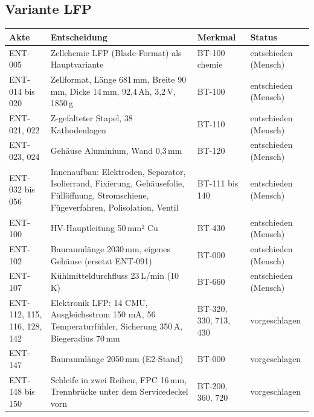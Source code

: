 \documentclass[10pt,a4paper]{article}
\begin{document}
\subsection*{Variante LFP}
\begin{longtable}{@{}p{1.9cm}p{7.2cm}p{3.5cm}p{2.0cm}@{}}\toprule
\textbf{Akte} & \textbf{Entscheidung} & \textbf{Merkmal} & \textbf{Status}\\\midrule\endhead
ENT-005 & Zellchemie LFP (Blade-Format) als Hauptvariante & BT-100 chemie & entschieden (Mensch)\\
ENT-014 bis 020 & Zellformat, Länge 681\,mm, Breite 90\,mm, Dicke 14\,mm, 92,4\,Ah, 3,2\,V, 1850\,g & BT-100 & entschieden (Mensch)\\
ENT-021, 022 & Z-gefalteter Stapel, 38 Kathodenlagen & BT-110 & entschieden (Mensch)\\
ENT-023, 024 & Gehäuse Aluminium, Wand 0,3\,mm & BT-120 & entschieden (Mensch)\\
ENT-032 bis 056 & Innenaufbau: Elektroden, Separator, Isolierrand, Fixierung, Gehäusefolie, Füllöffnung, Stromschiene, Fügeverfahren, Polisolation, Ventil & BT-111 bis 140 & entschieden (Mensch)\\
ENT-100 & HV-Hauptleitung 50\,mm² Cu & BT-430 & entschieden (Mensch)\\
ENT-102 & Bauraumlänge 2030\,mm, eigenes Gehäuse (ersetzt ENT-091) & BT-000 & entschieden (Mensch)\\
ENT-107 & Kühlmitteldurchfluss 23\,L/min (10\,K) & BT-660 & entschieden (Mensch)\\
ENT-112, 115, 116, 128, 142 & Elektronik LFP: 14 CMU, Ausgleichsstrom 150 mA, 56 Temperaturfühler, Sicherung 350\,A, Biegeradius 70\,mm & BT-320, 330, 713, 430 & vorgeschlagen\\
ENT-147 & Bauraumlänge 2050\,mm (E2-Stand) & BT-000 & vorgeschlagen\\
ENT-148 bis 150 & Schleife in zwei Reihen, FPC 16\,mm, Trennbrücke unter dem Servicedeckel vorn & BT-200, 360, 720 & vorgeschlagen\\\bottomrule
\end{longtable}
\end{document}
